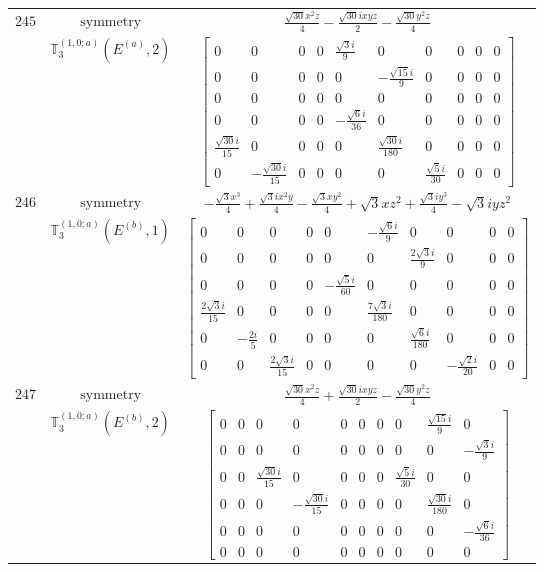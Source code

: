 \documentclass[fleqn,8pt,landscape]{jsarticle}
\begin{document}
\begin{longtable}{ccc}
$ 245 $ & $ \text{symmetry} $ & $ \frac{\sqrt{30} x^{2} z}{4} - \frac{\sqrt{30} i x y z}{2} - \frac{\sqrt{30} y^{2} z}{4} $ \\
$  $ & $ \mathbb{T}_{3}^{(1,0;a)}(E^{(a)},2) $ & $ \begin{bmatrix} 0 & 0 & 0 & 0 & \frac{\sqrt{3} i}{9} & 0 & 0 & 0 & 0 & 0 \\ 0 & 0 & 0 & 0 & 0 & - \frac{\sqrt{15} i}{9} & 0 & 0 & 0 & 0 \\ 0 & 0 & 0 & 0 & 0 & 0 & 0 & 0 & 0 & 0 \\ 0 & 0 & 0 & 0 & - \frac{\sqrt{6} i}{36} & 0 & 0 & 0 & 0 & 0 \\ \frac{\sqrt{30} i}{15} & 0 & 0 & 0 & 0 & \frac{\sqrt{30} i}{180} & 0 & 0 & 0 & 0 \\ 0 & - \frac{\sqrt{30} i}{15} & 0 & 0 & 0 & 0 & \frac{\sqrt{5} i}{30} & 0 & 0 & 0 \end{bmatrix} $ \\ \hline
$ 246 $ & $ \text{symmetry} $ & $ - \frac{\sqrt{3} x^{3}}{4} + \frac{\sqrt{3} i x^{2} y}{4} - \frac{\sqrt{3} x y^{2}}{4} + \sqrt{3} x z^{2} + \frac{\sqrt{3} i y^{3}}{4} - \sqrt{3} i y z^{2} $ \\
$  $ & $ \mathbb{T}_{3}^{(1,0;a)}(E^{(b)},1) $ & $ \begin{bmatrix} 0 & 0 & 0 & 0 & 0 & - \frac{\sqrt{6} i}{9} & 0 & 0 & 0 & 0 \\ 0 & 0 & 0 & 0 & 0 & 0 & \frac{2 \sqrt{3} i}{9} & 0 & 0 & 0 \\ 0 & 0 & 0 & 0 & - \frac{\sqrt{5} i}{60} & 0 & 0 & 0 & 0 & 0 \\ \frac{2 \sqrt{3} i}{15} & 0 & 0 & 0 & 0 & \frac{7 \sqrt{3} i}{180} & 0 & 0 & 0 & 0 \\ 0 & - \frac{2 i}{5} & 0 & 0 & 0 & 0 & \frac{\sqrt{6} i}{180} & 0 & 0 & 0 \\ 0 & 0 & \frac{2 \sqrt{3} i}{15} & 0 & 0 & 0 & 0 & - \frac{\sqrt{2} i}{20} & 0 & 0 \end{bmatrix} $ \\ \hline
$ 247 $ & $ \text{symmetry} $ & $ \frac{\sqrt{30} x^{2} z}{4} + \frac{\sqrt{30} i x y z}{2} - \frac{\sqrt{30} y^{2} z}{4} $ \\
$  $ & $ \mathbb{T}_{3}^{(1,0;a)}(E^{(b)},2) $ & $ \begin{bmatrix} 0 & 0 & 0 & 0 & 0 & 0 & 0 & 0 & \frac{\sqrt{15} i}{9} & 0 \\ 0 & 0 & 0 & 0 & 0 & 0 & 0 & 0 & 0 & - \frac{\sqrt{3} i}{9} \\ 0 & 0 & \frac{\sqrt{30} i}{15} & 0 & 0 & 0 & 0 & \frac{\sqrt{5} i}{30} & 0 & 0 \\ 0 & 0 & 0 & - \frac{\sqrt{30} i}{15} & 0 & 0 & 0 & 0 & \frac{\sqrt{30} i}{180} & 0 \\ 0 & 0 & 0 & 0 & 0 & 0 & 0 & 0 & 0 & - \frac{\sqrt{6} i}{36} \\ 0 & 0 & 0 & 0 & 0 & 0 & 0 & 0 & 0 & 0 \end{bmatrix} $ \\ \hline

\end{longtable}
\end{document}
